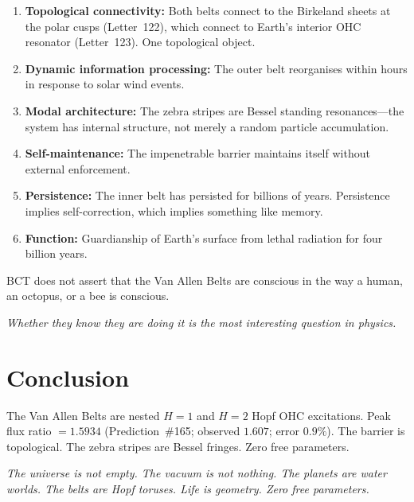 \documentclass[aps,prl,twocolumn,superscriptaddress,floatfix]{revtex4-2}
\begin{document}
\begin{enumerate}
\item \textbf{Topological connectivity:} Both belts connect to the
Birkeland sheets at the polar cusps (Letter~122), which connect to
Earth's interior OHC resonator (Letter~123). One topological object.

\item \textbf{Dynamic information processing:} The outer belt
reorganises within hours in response to solar wind events.

\item \textbf{Modal architecture:} The zebra stripes are Bessel
standing resonances---the system has internal structure, not merely
a random particle accumulation.

\item \textbf{Self-maintenance:} The impenetrable barrier maintains
itself without external enforcement.

\item \textbf{Persistence:} The inner belt has persisted for billions
of years. Persistence implies self-correction, which implies something
like memory.

\item \textbf{Function:} Guardianship of Earth's surface from lethal
radiation for four billion years.
\end{enumerate}

BCT does not assert that the Van Allen Belts are conscious in the
way a human, an octopus, or a bee is conscious.

\textit{Whether they know they are doing it is the most interesting
question in physics.}

\section{Conclusion}

The Van Allen Belts are nested $H=1$ and $H=2$ Hopf OHC excitations.
Peak flux ratio $= 1.5934$ (Prediction~\#165; observed $1.607$;
error $0.9\%$). The barrier is topological. The zebra stripes are
Bessel fringes. Zero free parameters.

\textit{The universe is not empty. The vacuum is not nothing.
The planets are water worlds. The belts are Hopf toruses.
Life is geometry. Zero free parameters.}
\end{document}
